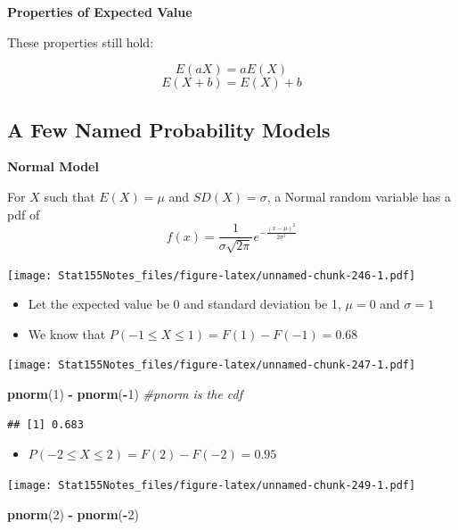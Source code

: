 \documentclass[]{book}
\newenvironment{Shaded}{\begin{snugshade}}{\end{snugshade}}
\newcommand{\CommentTok}[1]{\textcolor[rgb]{0.56,0.35,0.01}{\textit{#1}}}
\newcommand{\DecValTok}[1]{\textcolor[rgb]{0.00,0.00,0.81}{#1}}
\newcommand{\KeywordTok}[1]{\textcolor[rgb]{0.13,0.29,0.53}{\textbf{#1}}}
\newcommand{\NormalTok}[1]{#1}
\newcommand{\OperatorTok}[1]{\textcolor[rgb]{0.81,0.36,0.00}{\textbf{#1}}}
\newcommand{\StringTok}[1]{\textcolor[rgb]{0.31,0.60,0.02}{#1}}
\providecommand{\tightlist}{%
  \setlength{\itemsep}{0pt}\setlength{\parskip}{0pt}}
\begin{document}
\textbf{Properties of Expected Value}

These properties still hold:

\[ E(aX) =  aE(X)\]
\[E(X+b) = E(X) + b\]

\hypertarget{a-few-named-probability-models-1}{%
\subsection{A Few Named Probability Models}\label{a-few-named-probability-models-1}}

\textbf{Normal Model}

For \(X\) such that \(E(X) = \mu\) and \(SD(X) = \sigma\), a Normal random variable has a pdf of
\[f(x) =  \frac{1}{\sigma\sqrt{2\pi}}e^{-\frac{(x-\mu)^2}{2\sigma^2}}\]

\texttt{[image: Stat155Notes\_files/figure-latex/unnamed-chunk-246-1.pdf]}

\begin{itemize}
\item
  Let the expected value be 0 and standard deviation be 1, \(\mu = 0\) and \(\sigma = 1\)
\item
  We know that \(P(-1\leq X \leq 1) = F(1) - F(-1) = 0.68\)
\end{itemize}

\texttt{[image: Stat155Notes\_files/figure-latex/unnamed-chunk-247-1.pdf]}

\begin{Shaded}
\begin{Highlighting}[]
\KeywordTok{pnorm}\NormalTok{(}\DecValTok{1}\NormalTok{) }\OperatorTok{-}\StringTok{ }\KeywordTok{pnorm}\NormalTok{(}\OperatorTok{-}\DecValTok{1}\NormalTok{) }\CommentTok{#pnorm is the cdf}
\end{Highlighting}
\end{Shaded}

\begin{verbatim}
## [1] 0.683
\end{verbatim}

\begin{itemize}
\tightlist
\item
  \(P(-2\leq X \leq 2) = F(2) - F(-2) = 0.95\)
\end{itemize}

\texttt{[image: Stat155Notes\_files/figure-latex/unnamed-chunk-249-1.pdf]}

\begin{Shaded}
\begin{Highlighting}[]
\KeywordTok{pnorm}\NormalTok{(}\DecValTok{2}\NormalTok{) }\OperatorTok{-}\StringTok{ }\KeywordTok{pnorm}\NormalTok{(}\OperatorTok{-}\DecValTok{2}\NormalTok{)}
\end{Highlighting}
\end{Shaded}
\end{document}
